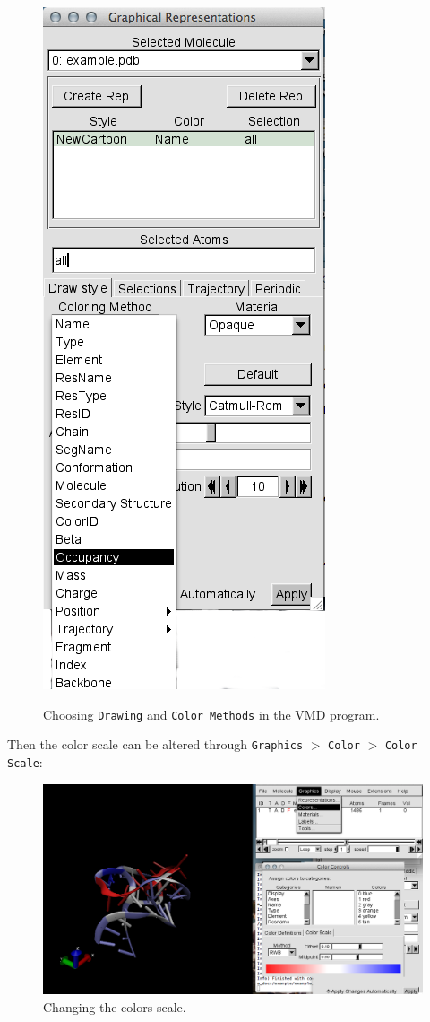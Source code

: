 \documentclass[12pt]{article}
\begin{document}
\begin{figure} [h!]
\begin{center}
{\includegraphics[scale=0.3]{pictures/vmd5.png}}
\end{center}
\caption{Choosing \texttt{Drawing} and \texttt{Color Methods} in the VMD program.}
\end{figure} 

\newpage
Then the color scale can be altered through \texttt{Graphics} $>$ \texttt{Color} $>$ \texttt{Color Scale}:

\begin{figure}[h!]
\centering
\includegraphics[scale=0.4]{./pictures/vmd6.png}
\caption{Changing the colors scale.}
\end{figure}
\end{document}
